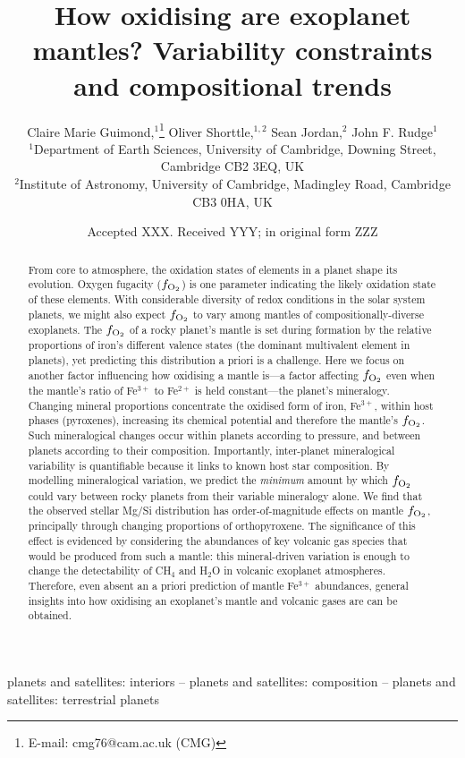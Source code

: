 \documentclass[fleqn,usenatbib,twocolumn]{mnras}
\title[Exoplanet mantle $f_{{\rm O}_2}$ variability]{How oxidising are exoplanet mantles? Variability constraints and compositional trends}
\author[C. M. Guimond et al.]{
Claire Marie Guimond,$^{1}$\thanks{E-mail: cmg76@cam.ac.uk (CMG)}
Oliver Shorttle,$^{1,2}$
Sean Jordan,$^{2}$
John F. Rudge$^{1}$
\\
$^{1}$Department of Earth Sciences, University of Cambridge, Downing Street, Cambridge CB2 3EQ, UK\\
$^{2}$Institute of Astronomy, University of Cambridge, Madingley Road, Cambridge CB3 0HA, UK
}
\date{Accepted XXX. Received YYY; in original form ZZZ}
\begin{document}
\label{firstpage}
\pagerange{\pageref{firstpage}--\pageref{lastpage}}
\maketitle

\begin{abstract}

From core to atmosphere, the oxidation states of elements in a planet shape its evolution. Oxygen fugacity ($f_{\rm O_2}$) is one parameter indicating the likely oxidation state of these elements. With considerable diversity of redox conditions in the solar system planets, we might also expect $f_{\rm O_2}$ to vary among mantles of compositionally-diverse exoplanets. The $f_{\rm O_2}$ of a rocky planet's mantle is set during formation by the relative proportions of iron's different valence states (the dominant multivalent element in planets), yet predicting this distribution a priori is a challenge. Here we focus on another factor influencing how oxidising a mantle is---a factor affecting $f_{\rm O_2}$ even when the mantle’s ratio of Fe$^{3+}$ to Fe$^{2+}$ is held constant---the planet’s mineralogy. Changing mineral proportions concentrate the oxidised form of iron, Fe$^{3+}$, within host phases (pyroxenes), increasing its chemical potential and therefore the mantle's $f_{\rm O_2}$. Such mineralogical changes occur within planets according to pressure, and between planets according to their composition. Importantly, inter-planet mineralogical variability is quantifiable because it links to known host star composition. By modelling mineralogical variation, we predict the \emph{minimum} amount by which $f_{\rm O_2}$ could vary between rocky planets from their variable mineralogy alone. We find that the observed stellar Mg/Si distribution has order-of-magnitude effects on mantle $f_{\rm O_2}$, principally through changing proportions of orthopyroxene. The significance of this effect is evidenced by considering the abundances of key volcanic gas species that would be produced from such a mantle: this mineral-driven variation is enough to change the detectability of CH$_4$ and H$_2$O in volcanic exoplanet atmospheres. Therefore, even absent an a priori prediction of mantle Fe$^{3+}$ abundances, general insights into how oxidising an exoplanet’s mantle and volcanic gases are can be obtained.

\end{abstract}

\begin{keywords}
planets and satellites: interiors -- planets and satellites: composition -- planets and satellites: terrestrial planets
\end{keywords}
\end{document}
